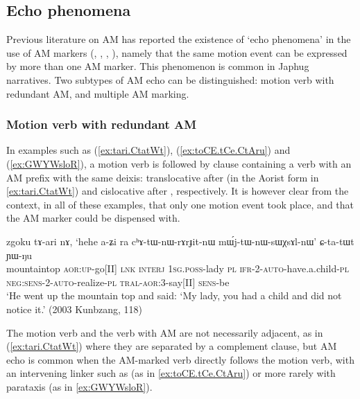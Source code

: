 \subsection{Echo phenomena} \label{sec:AM.echo}
Previous literature on AM has reported the existence of `echo phenomena' in the use of AM markers (\citealt[251]{wilkins91associated.motion}, \citealt[681--683]{vuillermet12eseejja}, \citealt[128--130]{rose15am}, \citealt[11]{guillaume16am}), namely that the same motion event can be expressed by more than one AM marker. This phenomenon is common in Japhug narratives. Two subtypes of AM echo can be distinguished: motion verb with redundant  AM, and multiple AM marking.

\subsubsection{Motion verb with redundant AM} \label{sec:redundant.AM}
In examples such as (\ref{ex:tari.CtatWt}), (\ref{ex:toCE.tCe.CtAru}) and (\ref{ex:GWYWsloR}), a motion verb is followed by clause containing a verb with an AM prefix with the same deixis: translocative after  (in the Aorist form  in \ref{ex:tari.CtatWt}) and cislocative after , respectively. It is however clear from the context, in all of these examples, that only one motion event took place, and that the AM marker could be dispensed with.
 
 \begin{exe}
\ex \label{ex:tari.CtatWt}
\gll zgoku tɤ-ari nɤ, `hehe a-ʑi ra cʰɤ-tɯ-nɯ-rɤrɟit-nɯ mɯ́j-tɯ-nɯ-sɯχsɤl-nɯ' ɕ-ta-tɯt ɲɯ-ŋu \\
mountaintop \textsc{aor}:\textsc{up}-go[II] \textsc{lnk} \textsc{interj} \textsc{1sg}.\textsc{poss}-lady \textsc{pl} \textsc{ifr}-2-\textsc{auto}-have.a.child-\textsc{pl} \textsc{neg}:\textsc{sens}-2-\textsc{auto}-realize-\textsc{pl} \textsc{tral}-\textsc{aor}:3\flobv{}-say[II] \textsc{sens}-be \\
\glt `He went up the mountain top and said: `My lady, you had a child and did not notice it.' (2003 Kunbzang, 118)
\end{exe}

The motion verb and the verb with AM are not necessarily adjacent, as in (\ref{ex:tari.CtatWt}) where they are separated by a complement clause, but AM echo is common when the AM-marked verb directly follows the motion verb, with an intervening linker such as  (as in \ref{ex:toCE.tCe.CtAru}) or more rarely with parataxis (as in \ref{ex:GWYWsloR}).

